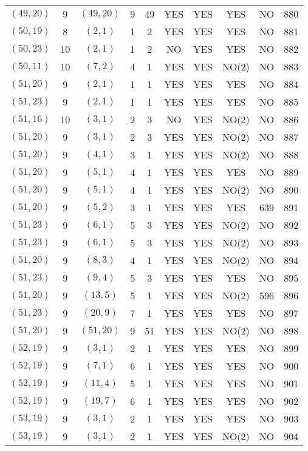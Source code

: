 \begin{longtable}{|c|c|c|c|c|c|c|c|c|c|}
$(49, 20)$ & 9 & $(49, 20)$ & 9 & 49 & YES & YES & YES & NO & 880\\
$(50, 19)$ & 8 & $(2, 1)$ & 1 & 2 & YES & YES & YES & NO & 881\\
$(50, 23)$ & 10 & $(2, 1)$ & 1 & 2 & NO & YES & YES & NO & 882\\
$(50, 11)$ & 10 & $(7, 2)$ & 4 & 1 & YES & YES & NO(2) & NO & 883\\
$(51, 20)$ & 9 & $(2, 1)$ & 1 & 1 & YES & YES & YES & NO & 884\\
$(51, 23)$ & 9 & $(2, 1)$ & 1 & 1 & YES & YES & YES & NO & 885\\
$(51, 16)$ & 10 & $(3, 1)$ & 2 & 3 & NO & YES & NO(2) & NO & 886\\
$(51, 20)$ & 9 & $(3, 1)$ & 2 & 3 & YES & YES & NO(2) & NO & 887\\
$(51, 20)$ & 9 & $(4, 1)$ & 3 & 1 & YES & YES & NO(2) & NO & 888\\
$(51, 20)$ & 9 & $(5, 1)$ & 4 & 1 & YES & YES & YES & NO & 889\\
$(51, 20)$ & 9 & $(5, 1)$ & 4 & 1 & YES & YES & NO(2) & NO & 890\\
$(51, 20)$ & 9 & $(5, 2)$ & 3 & 1 & YES & YES & YES & 639 & 891\\
$(51, 23)$ & 9 & $(6, 1)$ & 5 & 3 & YES & YES & NO(2) & NO & 892\\
$(51, 23)$ & 9 & $(6, 1)$ & 5 & 3 & YES & YES & NO(2) & NO & 893\\
$(51, 20)$ & 9 & $(8, 3)$ & 4 & 1 & YES & YES & NO(2) & NO & 894\\
$(51, 23)$ & 9 & $(9, 4)$ & 5 & 3 & YES & YES & YES & NO & 895\\
$(51, 20)$ & 9 & $(13, 5)$ & 5 & 1 & YES & YES & NO(2) & 596 & 896\\
$(51, 23)$ & 9 & $(20, 9)$ & 7 & 1 & YES & YES & YES & NO & 897\\
$(51, 20)$ & 9 & $(51, 20)$ & 9 & 51 & YES & YES & NO(2) & NO & 898\\
$(52, 19)$ & 9 & $(3, 1)$ & 2 & 1 & YES & YES & YES & NO & 899\\
$(52, 19)$ & 9 & $(7, 1)$ & 6 & 1 & YES & YES & YES & NO & 900\\
$(52, 19)$ & 9 & $(11, 4)$ & 5 & 1 & YES & YES & YES & NO & 901\\
$(52, 19)$ & 9 & $(19, 7)$ & 6 & 1 & YES & YES & YES & NO & 902\\
$(53, 19)$ & 9 & $(3, 1)$ & 2 & 1 & YES & YES & YES & NO & 903\\
$(53, 19)$ & 9 & $(3, 1)$ & 2 & 1 & YES & YES & NO(2) & NO & 904\\

\end{longtable}
